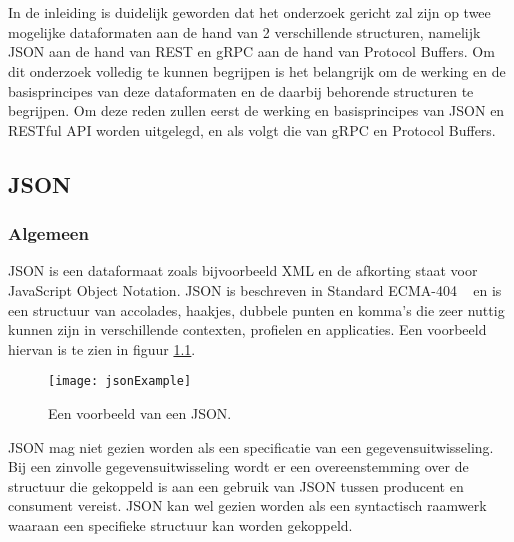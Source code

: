 \chapter{}
\label{ch:stand-van-zaken}



In de inleiding is duidelijk geworden dat het onderzoek gericht zal zijn op twee mogelijke dataformaten aan de hand van 2 verschillende structuren, namelijk JSON aan de hand van REST en gRPC aan de hand van Protocol Buffers. Om dit onderzoek volledig te kunnen begrijpen is het belangrijk om de werking en de basisprincipes van deze dataformaten en de daarbij behorende structuren te begrijpen. Om deze reden zullen eerst de werking en basisprincipes van JSON en RESTful API worden uitgelegd, en als volgt die van gRPC en Protocol Buffers.

\section{JSON}
\label{sec:JSON}

\subsection{Algemeen}
\label{subsec:Algemeen}

JSON is een dataformaat zoals bijvoorbeeld XML en de afkorting staat voor JavaScript Object Notation. JSON is beschreven in Standard ECMA-404 ~\autocite{Json2017} en is een structuur van accolades, haakjes, dubbele punten en komma's die zeer nuttig kunnen zijn in verschillende contexten, profielen en applicaties. Een voorbeeld hiervan is te zien in figuur \ref{fig:jsonExample}.

\begin{figure}[H]
    \centering
    \texttt{[image: jsonExample]}
    \caption[JSON Example]{Een voorbeeld van een JSON.}
    \label{fig:jsonExample}
\end{figure}

JSON mag niet gezien worden als een specificatie van een gegevensuitwisseling. Bij een zinvolle gegevensuitwisseling wordt er een overeenstemming over de structuur die gekoppeld is aan een gebruik van JSON tussen producent en consument vereist. JSON kan wel gezien worden als een syntactisch raamwerk waaraan een specifieke structuur kan worden gekoppeld.

